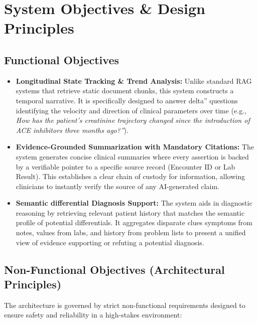 \section{System Objectives \& Design Principles}
\label{sec:objectives}

\subsection{Functional Objectives}
\begin{itemize} 
    \item \textbf{Longitudinal State Tracking \& Trend Analysis:} Unlike standard RAG systems that retrieve static document chunks, this system constructs a temporal narrative. It is specifically designed to answer delta'' questions identifying the velocity and direction of clinical parameters over time (e.g., \textit{How has the patient's creatinine trajectory changed since the introduction of ACE inhibitors three months ago?''}).
    
    \item \textbf{Evidence-Grounded Summarization with Mandatory Citations:} The system generates concise clinical summaries where every assertion is backed by a verifiable pointer to a specific source record (Encounter ID or Lab Result). This establishes a clear chain of custody for information, allowing clinicians to instantly verify the source of any AI-generated claim.

    \item \textbf{Semantic differential Diagnosis Support:} The system aids in diagnostic reasoning by retrieving relevant patient history that matches the semantic profile of potential differentials. It aggregates disparate clues symptoms from notes, values from labs, and history from problem lists to present a unified view of evidence supporting or refuting a potential diagnosis.
\end{itemize}

\subsection{Non-Functional Objectives (Architectural Principles)}
The architecture is governed by strict non-functional requirements designed to ensure safety and reliability in a high-stakes environment:

